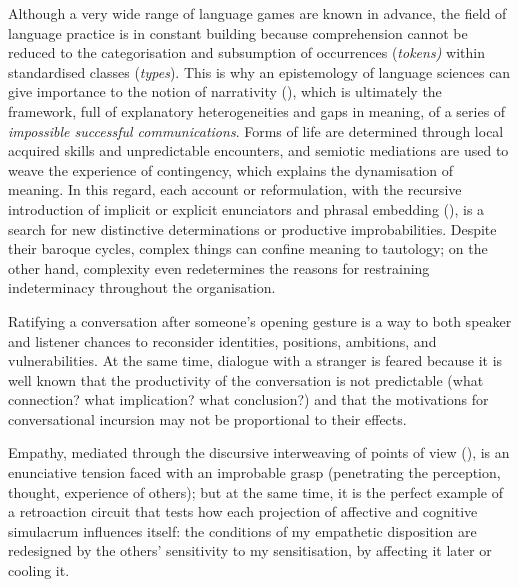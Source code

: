 \documentclass[output=paper]{langscibook}
\begin{document}
Although a very wide range of language games are known in advance, the field of language practice is in constant building because comprehension cannot be reduced to the categorisation and subsumption of occurrences (\textit{tokens)} within standardised classes (\textit{types}). This is why an epistemology of language sciences can give importance to the notion of narrativity (), which is ultimately the framework, full of explanatory heterogeneities and gaps in meaning, of a series of \textit{impossible successful communications}. Forms of life are determined through local acquired skills and unpredictable encounters, and semiotic mediations are used to weave the experience of contingency, which explains the dynamisation of meaning. In this regard, each account or reformulation, with the recursive introduction of implicit or explicit enunciators and phrasal embedding (), is a search for new distinctive determinations or productive improbabilities. Despite their baroque cycles, complex things can confine meaning to tautology; on the other hand, complexity even redetermines the reasons for restraining indeterminacy throughout the organisation.

Ratifying a conversation after someone's opening gesture is a way to both speaker and listener chances to reconsider identities, positions, ambitions, and vulnerabilities. At the same time, dialogue with a stranger is feared because it is well known that the productivity of the conversation is not predictable (what connection? what implication? what conclusion?) and that the motivations for conversational incursion may not be proportional to their effects.

Empathy, mediated through the discursive interweaving of points of view (), is an enunciative tension faced with an improbable grasp (penetrating the perception, thought, experience of others); but at the same time, it is the perfect example of a retroaction circuit that tests how each projection of affective and cognitive simulacrum influences itself: the conditions of my empathetic disposition are redesigned by the others’ sensitivity to my sensitisation, by affecting it later or cooling it.
\end{document}
